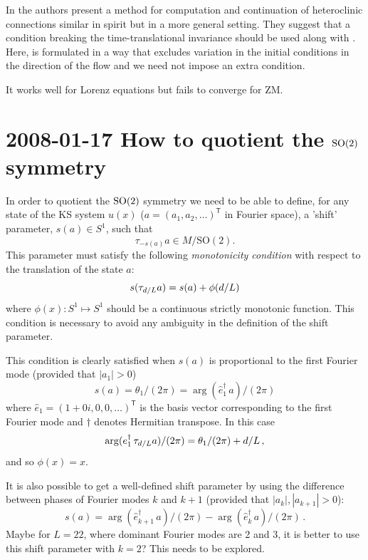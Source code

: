 In  the authors present a
method for computation and continuation of heteroclinic
connections similar in spirit but in a more general setting.
They suggest that a condition breaking the time-translational
invariance should be used along with .
Here,  is formulated in a way that
excludes variation in the initial conditions in the direction
of the flow and we need not impose an extra condition.

It works well for Lorenz equations but fails to converge for ZM.



\section{2008-01-17 How to quotient the $\textrm{SO}(2)$ symmetry}

\medskip{}
In order to quotient the $\textrm{SO}(2)$ symmetry we need to be able to define,
for any state of the KS system $u(x)$
($a = (a_1, a_2, \ldots)^\mathsf{T}$ in Fourier space),
a 'shift' parameter, $s(a) \in S^1 $, such that
\[ \tau_{-s(a)} a \in M/\mathrm{SO}(2). \]
This parameter must satisfy the following {\em monotonicity condition} with
respect to the translation of the state $a$:
\[ s(\tau_{d/L}a) = s(a) + \phi(d/L) \]
where $\phi(x): S^1 \mapsto S^1$ should be a continuous strictly monotonic function.
This condition is necessary to avoid any ambiguity in the definition of
the shift parameter.

This condition is clearly satisfied when $s(a)$ is proportional to
the first Fourier mode (provided that $|a_1| > 0$)
\begin{equation}
  s(a) =  \theta_1/(2\pi) = \arg(\hat{e}_1^\dagger\,a)/(2\pi)
\label{eq:shift1} \end{equation}
where $\hat{e}_1 = (1+0i, 0, 0, \ldots)^\mathsf{T}$ is the basis vector corresponding
to the first Fourier mode and $\dagger$ denotes Hermitian transpose.
In this case
\[ \arg (e_1^\dagger\,\tau_{d/L}a)/(2\pi) = \theta_1/(2\pi) + d/L\,, \]
and so $\phi(x) = x$.

It is also possible to get a well-defined shift parameter by
using the difference between phases of Fourier modes $k$ and $k+1$ (provided
that $|a_k|, |a_{k+1}| > 0$):
\begin{equation}
  s(a) = \arg(\hat{e}_{k+1}^\dagger\,a)/(2\pi) -
  \arg(\hat{e}_{k}^\dagger\,a)/(2\pi)\,.
  \label{eq:shiftk} \end{equation}
Maybe for $L = 22$, where dominant Fourier modes are 2 and 3, it is better to use
this shift parameter with $k = 2$?  This needs to be explored.

